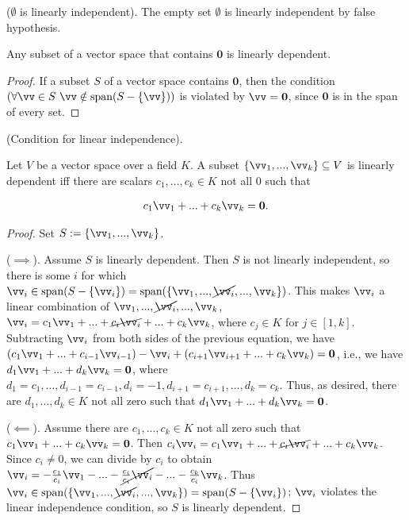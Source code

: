 \begin{remark}
    ($\emptyset$ is linearly independent). The empty set $\emptyset$ is linearly independent by false hypothesis.
\end{remark}

\begin{theorem}
    Any subset of a vector space that contains $\mathbf{0}$ is linearly dependent.
\end{theorem}

\begin{proof}
    If a subset $S$ of a vector space contains $\mathbf{0}$, then the condition $(\forall \vv \in S \spc \vv \notin \spann(S - \{\vv\}))$ is violated by $\vv = \mathbf{0}$, since $\mathbf{0}$ is in the span of every set.
\end{proof}

\begin{theorem}
    (Condition for linear independence).
    
    Let $V$ be a vector space over a field $K$. A subset $\{\vv_1, ..., \vv_k\} \subseteq V$ is linearly dependent iff there are scalars $c_1, ..., c_k \in K$ not all $0$ such that
    
    \begin{align*}
        c_1 \vv_1 + ... + c_k \vv_k = \mathbf{0}.
    \end{align*}
\end{theorem}

\begin{proof}
    Set $S := \{\vv_1, ..., \vv_k\}$.
    
   ($\implies$). Assume $S$ is linearly dependent. Then $S$ is not linearly independent, so there is some $i$ for which ${\vv_i \in \spann(S - \{\vv_i\})} = \spann(\{\vv_1, ..., \cancel{\vv_i}, ..., \vv_k\})$. This makes $\vv_i$ a linear combination of $\vv_1, ..., \cancel{\vv_i}, ..., \vv_k$, ${\vv_i = c_1 \vv_1 + ... + \cancel{c_i \vv_i} + ... + c_k \vv_k}$, where $c_j \in K$ for $j \in [1, k]$. Subtracting $\vv_i$ from both sides of the previous equation, we have ${(c_1 \vv_1 + ... + c_{i - 1} \vv_{i - 1}) - \vv_i + (c_{i + 1} \vv_{i + 1} + ... + c_k \vv_k) = \mathbf{0}}$, i.e., we have ${d_1 \vv_1 + ... + d_k \vv_k = \mathbf{0}}$, where $d_1 = c_1, ..., d_{i - 1} = c_{i - 1}, d_i = -1, d_{i + 1} = c_{i + 1}, ..., d_k = c_k$. Thus, as desired, there are $d_1, ..., d_k \in K$ not all zero such that $d_1 \vv_1 + ... + d_k \vv_k = \mathbf{0}$.
   
   ($\impliedby$). Assume there are $c_1, ..., c_k \in K$ not all zero such that $c_1 \vv_1 + ... + c_k \vv_k = \mathbf{0}$. Then $c_i \vv_i = c_1 \vv_1 + ... + \cancel{c_i \vv_i} + ... + c_k \vv_k$. Since $c_i \neq 0$, we can divide by $c_i$ to obtain $\vv_i = -\frac{c_1}{c_i} \vv_1 - ... - \cancel{\frac{c_i}{c_i}\vv_i} - ... - \frac{c_k}{c_i}\vv_k$. Thus $\vv_i \in \spann(\{\vv_1, ..., \cancel{\vv_i}, ..., \vv_k\}) = \spann(S - \{\vv_i\})$; $\vv_i$ violates the linear independence condition, so $S$ is linearly dependent.
\end{proof}

